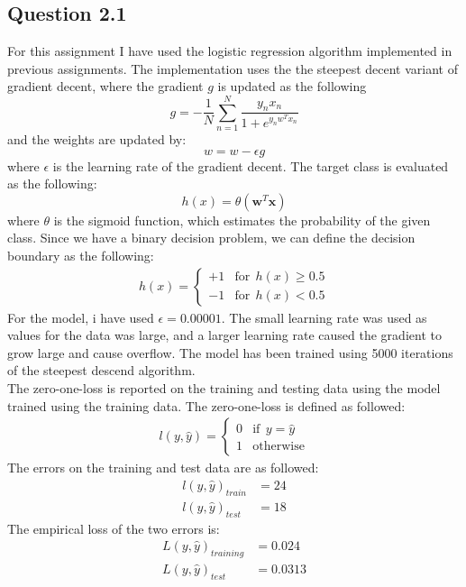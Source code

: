 \documentclass{article}
\begin{document}
\subsection{Question 2.1}
For this assignment I have used the logistic regression algorithm implemented in previous assignments. The implementation uses the the steepest decent variant of gradient decent, where the gradient $g$ is updated as the following
\begin{equation}
g = - \dfrac{1}{N} \sum\limits_{n=1}^N \dfrac{y_nx_n}{1+e^{y_nw^Tx_n}}
\end{equation}
and the weights are updated by: 
\begin{equation}
w = w - \epsilon g
\end{equation}
where $\epsilon$ is the learning rate of the gradient decent. The target class is evaluated as the following:
\begin{equation*}
h(x) = \theta(\mathbf{w}^T\mathbf{x})
\end{equation*}
where $\theta$ is the sigmoid function, which estimates the probability of the given class. Since we have a binary decision problem, we can define the decision boundary as the following: 
\begin{align*}
h(x) =
\begin{cases} 
      +1 & \text{for} \;\, h(x) \geq 0.5 \\
      -1 & \text{for} \;\, h(x) < 0.5
   \end{cases}
\end{align*}
For the model, i have used $\epsilon = 0.00001$. The small learning rate was used as values for the data was large, and a larger learning rate caused the gradient to grow large and cause overflow. The model has been trained using 5000 iterations of the steepest descend algorithm. \\
The zero-one-loss is reported on the training and testing data using the model trained using the training data. The zero-one-loss is defined as followed:
\begin{align*}
l(y,\hat{y}) =
\begin{cases} 
      0 & \text{if} \;\, y = \hat{y} \\
      1 & \text{otherwise}
   \end{cases}
\end{align*}
The errors on the training and test data are as followed:
\begin{align*}
l(y,\hat{y})_{train} &= 24\\
l(y,\hat{y})_{test} &= 18
\end{align*}
The empirical loss of the two errors is:
\begin{align*}
L(y,\hat{y})_{training} &= 0.024\\
L(y,\hat{y})_{test} &= 0.0313
\end{align*}
\end{document}
